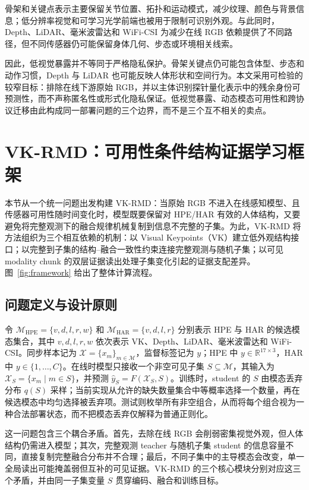 \documentclass[journal]{IEEEtran}
\begin{document}
骨架和关键点表示主要保留关节位置、拓扑和运动模式，减少纹理、颜色与背景信息；低分辨率视觉和可学习光学前端也被用于限制可识别外观\cite{lowresDepth,privacyOptics}。与此同时，Depth、LiDAR、毫米波雷达和 WiFi-CSI 为减少在线 RGB 依赖提供了不同路径，但不同传感器仍可能保留身体几何、步态或环境相关线索。

因此，低视觉暴露并不等同于严格隐私保护。骨架关键点仍可能包含体型、步态和动作习惯，Depth 与 LiDAR 也可能反映人体形状和空间行为。本文采用可检验的较窄目标：排除在线下游原始 RGB，并以主体识别探针量化表示中的残余身份可预测性，而不声称匿名性或形式化隐私保证。低视觉暴露、动态模态可用性和跨协议迁移由此构成同一部署问题的三个边界，而不是三个互不相关的卖点。

\section{VK-RMD：可用性条件结构证据学习框架}

本节从一个统一问题出发构建 VK-RMD：当原始 RGB 不进入在线感知模型、且传感器可用性随时间变化时，模型既要保留对 HPE/HAR 有效的人体结构，又要避免将完整观测下的融合规律机械复制到信息不完整的子集。为此，VK-RMD 将方法组织为三个相互依赖的机制：以 Visual Keypoints（VK）建立低外观结构接口；以完整到子集的结构--融合一致性约束连接完整观测与随机子集；以可见 modality chunk 的双层证据读出处理子集变化引起的证据支配差异。图~\ref{fig:framework} 给出了整体计算流程。

\subsection{问题定义与设计原则}

令 $\mathcal{M}_{\mathrm{HPE}}=\{v,d,l,r,w\}$ 和 $\mathcal{M}_{\mathrm{HAR}}=\{v,d,l,r\}$ 分别表示 HPE 与 HAR 的候选模态集合，其中 $v,d,l,r,w$ 依次表示 VK、Depth、LiDAR、毫米波雷达和 WiFi-CSI。同步样本记为 $\mathcal{X}=\{x_m\}_{m\in\mathcal{M}}$，监督标签记为 $y$；HPE 中 $y\in\mathbb{R}^{17\times3}$，HAR 中 $y\in\{1,\ldots,C\}$。在线时模型只接收一个非空可见子集 $S\subseteq\mathcal M$，其输入为 $\mathcal X_S=\{x_m\mid m\in S\}$，并预测 $\hat y_S=F(\mathcal X_S,S)$。训练时，student 的 $S$ 由模态丢弃分布 $q(S)$ 采样；当前实现从允许的缺失数量集合中等概率选择一个数量，再在候选模态中均匀选择被丢弃项。测试则枚举所有非空组合，从而将每个组合视为一种合法部署状态，而不把模态丢弃仅解释为普通正则化。

这一问题包含三个耦合矛盾。首先，去除在线 RGB 会削弱密集视觉外观，但人体结构仍需进入模型；其次，完整观测 teacher 与随机子集 student 的信息容量不同，直接复制完整融合分布并不合理；最后，不同子集中的主导模态会改变，单一全局读出可能掩盖弱但互补的可见证据。VK-RMD 的三个核心模块分别对应这三个矛盾，并由同一子集变量 $S$ 贯穿编码、融合和训练目标。
\end{document}
